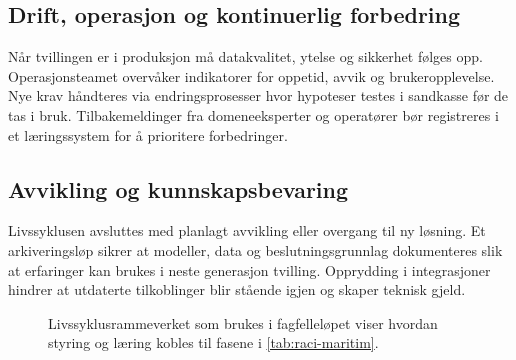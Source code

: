 \subsection*{Drift, operasjon og kontinuerlig forbedring}
Når tvillingen er i produksjon må datakvalitet, ytelse og sikkerhet følges opp. Operasjonsteamet overvåker indikatorer for oppetid, avvik og brukeropplevelse. Nye krav håndteres via endringsprosesser hvor hypoteser testes i sandkasse før de tas i bruk. Tilbakemeldinger fra domeneeksperter og operatører bør registreres i et læringssystem for å prioritere forbedringer.

\subsection*{Avvikling og kunnskapsbevaring}
Livssyklusen avsluttes med planlagt avvikling eller overgang til ny løsning. Et arkiveringsløp sikrer at modeller, data og beslutningsgrunnlag dokumenteres slik at erfaringer kan brukes i neste generasjon tvilling. Opprydding i integrasjoner hindrer at utdaterte tilkoblinger blir stående igjen og skaper teknisk gjeld.

\begin{figure}[htbp]
    \centering
    \caption{Livssyklusrammeverket som brukes i fagfelleløpet viser hvordan styring og læring kobles til fasene i \autoref{tab:raci-maritim}.}
    \label{fig:livssyklusramme}
\end{figure}

